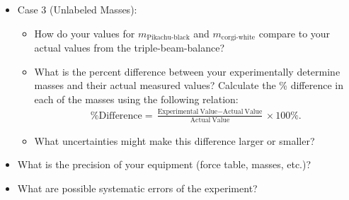 \begin{itemize}
\item Case 3 (Unlabeled Masses):
\begin{itemize}
    \item How do your values for $m_\text{Pikachu-black}$ and $m_\text{corgi-white}$ compare to your actual values from the triple-beam-balance?
    \item What is the percent difference between your experimentally determine masses and their actual measured values? Calculate the \% difference in each of the masses using the following relation:
	\begin{align} %
        \label{M1:PercentDiff}
	\mbox{\% Difference} = \frac{\mbox{Experimental} \ \mbox{Value} - \mbox{Actual} \ \mbox{Value}}{\mbox{Actual} \ \mbox{Value}} \times 100\%.
	\end{align}
    \item What uncertainties might make this difference larger or smaller?
\end{itemize}
\item What is the precision of your equipment (force table, masses, etc.)?
\item What are possible systematic errors of the experiment?




    
\end{itemize}

